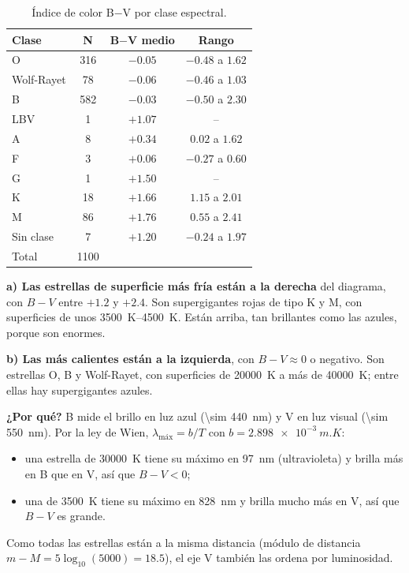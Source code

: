 \documentclass[11pt,a4paper]{article}
\begin{document}
\begin{table}[H]
\centering
\caption{Índice de color B$-$V por clase espectral.}
\begin{tabular}{lccc}
\toprule
Clase & N & B$-$V medio & Rango \\
\midrule
O & 316 & $-0.05$ & $-0.48$ a $1.62$ \\
Wolf-Rayet & 78 & $-0.06$ & $-0.46$ a $1.03$ \\
B & 582 & $-0.03$ & $-0.50$ a $2.30$ \\
LBV & 1 & $+1.07$ & -- \\
A & 8 & $+0.34$ & $0.02$ a $1.62$ \\
F & 3 & $+0.06$ & $-0.27$ a $0.60$ \\
G & 1 & $+1.50$ & -- \\
K & 18 & $+1.66$ & $1.15$ a $2.01$ \\
M & 86 & $+1.76$ & $0.55$ a $2.41$ \\
Sin clase & 7 & $+1.20$ & $-0.24$ a $1.97$ \\
\midrule
Total & 1100 & & \\
\bottomrule
\end{tabular}
\end{table}

\textbf{a) Las estrellas de superficie más fría están a la derecha} del diagrama, con $B-V$ entre $+1.2$
y $+2.4$. Son supergigantes rojas de tipo K y M, con superficies de unos \SIrange{3500}{4500}{K}. Están
arriba, tan brillantes como las azules, porque son enormes.

\textbf{b) Las más calientes están a la izquierda}, con $B-V \approx 0$ o negativo. Son estrellas O, B y
Wolf-Rayet, con superficies de \SI{20000}{K} a más de \SI{40000}{K}; entre ellas hay supergigantes
azules.

\textbf{¿Por qué?} B mide el brillo en luz azul (\SI{\sim 440}{nm}) y V en luz visual
(\SI{\sim 550}{nm}). Por la ley de Wien, $\lambda_\text{máx} = b/T$ con $b = \SI{2.898e-3}{m.K}$:
\begin{itemize}
  \item una estrella de \SI{30000}{K} tiene su máximo en \SI{97}{nm} (ultravioleta) y brilla más en B
  que en V, así que $B-V < 0$;
  \item una de \SI{3500}{K} tiene su máximo en \SI{828}{nm} y brilla mucho más en V, así que $B-V$ es
  grande.
\end{itemize}
Como todas las estrellas están a la misma distancia (módulo de distancia
$m - M = 5\log_{10}(5000) = 18.5$), el eje V también las ordena por luminosidad.
\end{document}

